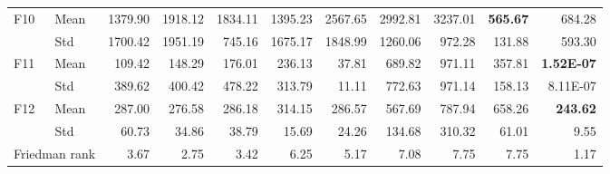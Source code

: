 \begin{tabular}{@{}llrrrrrrrrr@{}}
F10 & Mean & 1379.90 & 1918.12 & 1834.11 & 1395.23 & 2567.65 & 2992.81 & 3237.01 & \textbf{565.67} & 684.28 \\
 & Std & 1700.42 & 1951.19 & 745.16 & 1675.17 & 1848.99 & 1260.06 & 972.28 & 131.88 & 593.30 \\
F11 & Mean & 109.42 & 148.29 & 176.01 & 236.13 & 37.81 & 689.82 & 971.11 & 357.81 & \textbf{1.52E-07} \\
 & Std & 389.62 & 400.42 & 478.22 & 313.79 & 11.11 & 772.63 & 971.14 & 158.13 & 8.11E-07 \\
F12 & Mean & 287.00 & 276.58 & 286.18 & 314.15 & 286.57 & 567.69 & 787.94 & 658.26 & \textbf{243.62} \\
 & Std & 60.73 & 34.86 & 38.79 & 15.69 & 24.26 & 134.68 & 310.32 & 61.01 & 9.55 \\
\midrule
\multicolumn{2}{l}{Friedman rank} & 3.67 & 2.75 & 3.42 & 6.25 & 5.17 & 7.08 & 7.75 & 7.75 & 1.17 \\
\bottomrule
\end{tabular}
